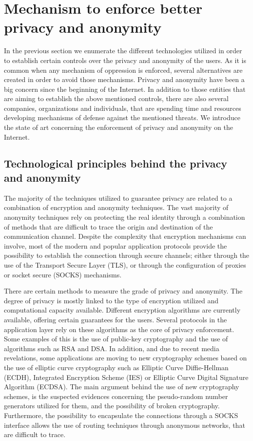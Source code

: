 \documentclass[conference]{IEEEtran}
\begin{document}
\section{Mechanism to enforce better privacy and anonymity}

In the previous section we enumerate the different technologies utilized
in order to establish certain controls over the privacy and anonymity
of the users. As it is common when any mechanism of oppression is enforced, 
several alternatives are created in order to avoid those mechanisms. Privacy
and anonymity have been a big concern since the beginning of the Internet.
In addition to those entities that are aiming to establish the above mentioned controls, there are also several companies, organizations and individuals, that are spending time and resources developing mechanisms of defense against the mentioned threats. We introduce the state of art concerning the enforcement of privacy and anonymity on the Internet.

\subsection{Technological principles behind the privacy and anonymity}

The majority of the techniques utilized to guarantee privacy are related to a combination of encryption and anonymity techniques. The vast majority of anonymity techniques rely on protecting the real identity through a combination of methods that are difficult to trace the origin and destination of the communication channel. Despite the complexity that encryption mechanisms can involve, most of the modern and popular application protocols provide the possibility to establish the connection through secure channels; either through the use of the Transport Secure Layer (TLS), or through the configuration of proxies or socket secure (SOCKS) mechanisms. 

There are certain methods to measure the grade of privacy and anonymity. The degree of privacy is mostly linked to the type of encryption utilized and computational capacity available. Different encryption algorithms are currently available, offering certain guarantees for the users. Several protocols in the application layer rely on these algorithms as the core of privacy enforcement. Some examples of this is the use of public-key cryptography\cite{rfc4880} and the use of algorithms such as RSA\cite{rfc3447} and DSA\cite{NIST}. In addition, and due to recent media revelations, some applications are moving to new cryptography schemes based on the use of elliptic curve cryptography such as Elliptic Curve Diffie-Hellman (ECDH), Integrated Encryption Scheme (IES) or  Elliptic Curve Digital Signature Algorithm (ECDSA). The main argument behind the use of new cryptography schemes, is the suspected evidences concerning the pseudo-random number generators utilized for them, and the possibility of broken cryptography\cite{FS2007}. Furthermore, the possibility to encapsulate the connections through a SOCKS interface allows the use of routing techniques through anonymous networks, that are difficult to trace.
\end{document}
